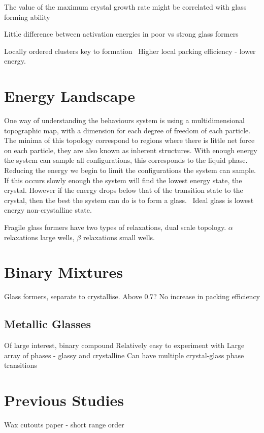 The value of the maximum crystal growth rate might be correlated with glass forming ability~\cite{tang:13}

Little difference between activation energies in poor vs strong glass formers~\cite{tang:13}

Locally ordered clusters key to formation~\cite{yang:12} Higher local packing efficiency - lower energy. 

\section{Energy Landscape}
One way of understanding the behaviours system is using a multidimensional topographic map, with a dimension for each degree of freedom of each particle. The minima of this topology correspond to regions where there is little net force on each particle, they are also known as inherent structures. With enough energy the system can sample all configurations, this corresponds to the liquid phase. Reducing the energy we begin to limit the configurations the system can sample. If this occurs slowly enough the system will find the lowest energy state, the crystal. However if the energy drops below that of the transition state to the crystal, then the best the system can do is to form a glass.~\cite{stillinger:95} Ideal glass is lowest energy non-crystalline state.

\begin{figure}
\end{figure}

Fragile glass formers have two types of relaxations, dual scale topology. $\alpha$ relaxations large wells, $\beta$ relaxations small wells.~\cite{stilliger:95}

\section{Binary Mixtures}
Glass formers, separate to crystallise. Above 0.7? No increase in packing efficiency

\subsection{Metallic Glasses}
Of large interest, binary compound
Relatively easy to experiment with
Large array of phases - glassy and crystalline
Can have multiple crystal-glass phase transitions



\section{Previous Studies}
Wax cutouts paper - short range order

